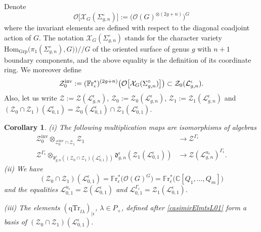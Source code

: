 \documentclass[11pt]{amsart}
\newtheorem{cor}[teo]{Corollary}
\newcommand{\e}{\epsilon}
\newcommand{\mc}{\mathbb{C}}
\newcommand{\Ll}{\mathcal{L}}
\begin{document}
\indent Denote
$$\mathcal{O}\bigl[ \mathcal{X}_G(\Sigma_{g,n}^{\circ}) \bigr]  := \bigl( \mathcal{O}(G)^{\otimes (2g+n)} \bigr)^{G}$$
where the invariant elements are defined with respect to the diagonal coadjoint action of $G$. The notation $\mathcal{X}_G(\Sigma_{g,n}^\circ)$ stands for the character variety $\mathrm{Hom}_{\mathrm{Grp}}\bigl( \pi_1(\Sigma_{g,n}^\circ),G) \bigr)/\!/G$ of the oriented surface of genus $g$ with $n+1$ boundary components, and the above equality is the definition of its coordinate ring. We moreover define
\[ \mathcal{Z}_0^{\rm inv}  := (\mathbb{F}\mathrm{r}_{\epsilon}^*)^{(2g+n)}\bigl( \mathcal{O}\bigl[ \mathcal{X}_G(\Sigma_{g,n}^{\circ}) \bigr] \bigr) \subset \mathcal{Z}_0(\Ll_{g,n}^{\e}). \]
Also, let us write $\mathcal{Z} := \mathcal{Z}(\mathcal{L}_{g,n}^{\e})$, $\mathcal{Z}_0 := \mathcal{Z}_0(\mathcal{L}_{g,n}^{\e})$, $\mathcal{Z}_1 := \mathcal{Z}_1(\mathcal{L}_{g,n}^{\e})$ and  $(\mathcal{Z}_0 \cap\mathcal{Z}_1) (\mathcal{L}_{0,1}^\e) = \mathcal{Z}_0(\mathcal{L}_{0,1}^\e)  \cap\mathcal{Z}_1(\mathcal{L}_{0,1}^\e)$. 
\begin{cor}\label{FrisoG-inv} (i) The following multiplication maps are isomorphisms of algebras 
\begin{align*}
\mathcal{Z}_0^{\mathrm{inv}}  \otimes_{\mathcal{Z}_0^{\mathrm{inv}} \cap \mathcal{Z}_1}  \mathcal{Z}_1 & \to \mathcal{Z}^{\Gamma_\e}\\
\mathcal{Z}^{\Gamma_\epsilon} \otimes_{\mathfrak{d}_{g,n}^\e((\mathcal{Z}_0 \cap\mathcal{Z}_1) (\mathcal{L}_{0,1}^\e))} \mathfrak{d}_{g,n}^\e(\mathcal{Z}_1(\Ll_{0,1}^{\e})) & \to \mathcal{Z}(\Ll_{g,n}^{u_\e})^{\Gamma_\e}.
\end{align*}
(ii) We have 
\[ (\mathcal{Z}_0 \cap\mathcal{Z}_1) (\mathcal{L}_{0,1}^\e) =\mathbb{F}\mathrm{r}_{\epsilon}^*\bigl(\mathcal{O}(G)^{G}\bigr) = \mathbb{F}\mathrm{r}_{\epsilon}^*\bigl(\mc[Q_1,\ldots, Q_m]\bigr) \]
and the equalities $\mathcal{L}_{0,1}^{u_\epsilon}= \mathcal{Z}(\mathcal{L}_{0,1}^{\e})$ and  $\mathcal{L}_{0,1}^{\Gamma_\epsilon} =  \mathcal{Z}_1(\Ll_{0,1}^\e)$.

(iii) The elements $(\mathrm{qTr}_{l\lambda})_{\vert \e}$, $\lambda\in P_+$, defined after \eqref{casimirElmtsL01} form a basis of $(\mathcal{Z}_0 \cap\mathcal{Z}_1) (\mathcal{L}_{0,1}^\e)$.
\end{cor} 
\end{document}
